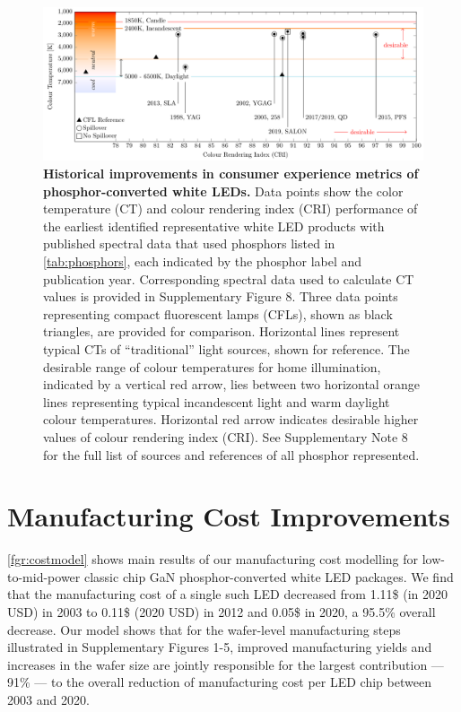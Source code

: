 \documentclass[parskip=full]{article}
\begin{document}
\begin{figure}[h!]
 \centering
 \vspace{-5mm}
 \includegraphics[width=\textwidth]{figures/breakthroughs_consumer-experience.pdf}
 \caption{\textbf{Historical improvements in consumer experience metrics of phosphor-converted white LEDs.} Data points show the color temperature (CT) and colour rendering index (CRI) performance of the earliest identified representative white LED products with published spectral data that used phosphors listed in \cref{tab:phosphors}, each indicated by the phosphor label and publication year. Corresponding spectral data used to calculate CT values is provided in Supplementary Figure 8. Three data points representing compact fluorescent lamps (CFLs)\cite{cie_reference}, shown as black triangles, are provided for comparison. Horizontal lines represent typical CTs of “traditional” light sources, shown for reference. The desirable range of colour temperatures for home illumination, indicated by a vertical red arrow, lies between two horizontal orange lines representing typical incandescent light and warm daylight colour temperatures. Horizontal red arrow indicates desirable higher values of colour rendering index (CRI). See Supplementary Note 8 for the full list of sources and references of all phosphor represented.}
 \label{fgr:consumer_experience}
\end{figure}

\clearpage
\section{Manufacturing Cost Improvements}

\cref{fgr:costmodel} shows main results of our manufacturing cost modelling for low-to-mid-power classic chip GaN phosphor-converted white LED packages. We find that the manufacturing cost of a single such LED decreased from 1.11\$ (in 2020 USD) in 2003 to 0.11\$ (2020 USD) in 2012 and 0.05\$ in 2020, a 95.5\% overall decrease. Our model shows that for the wafer-level manufacturing steps illustrated in Supplementary Figures 1-5, improved manufacturing yields and increases in the wafer size are jointly responsible for the largest contribution — 91\% — to the overall reduction of manufacturing cost per LED chip between 2003 and 2020.
\end{document}
